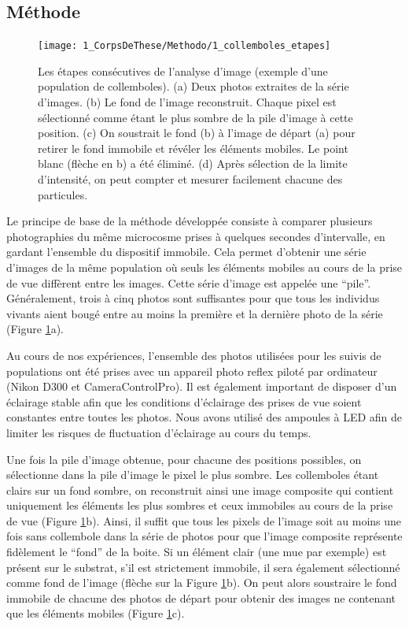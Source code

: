 \subsection{Méthode}

\begin{figure}[!ht]
\begin{center}
\texttt{[image: 1\_CorpsDeThese/Methodo/1\_collemboles\_etapes]}
\caption[ Les étapes
de l'analyse d'image]{Les étapes consécutives de l'analyse d'image (exemple
d'une population de collemboles).
(a) Deux photos extraites de la série d'images. (b) Le fond de l'image
reconstruit. Chaque pixel est sélectionné comme étant le plus sombre de la
pile d'image à cette position. (c) On soustrait le fond (b) à l'image de départ
(a) pour retirer le fond immobile et révéler les éléments mobiles. Le point blanc
(flèche en b) a été éliminé. (d) Après sélection de la limite d'intensité, on
peut compter et mesurer facilement chacune des particules.}
\label{fig:photoetapes}
\end{center}
\end{figure}



Le principe de base de la méthode développée consiste à comparer plusieurs
photographies du même microcosme prises à quelques secondes d'intervalle, en
gardant l'ensemble du dispositif immobile. Cela permet d'obtenir une série
d'images de la même population où seuls les éléments mobiles au cours de la
prise de vue diffèrent entre les images. Cette série d'image est appelée une
``pile''.
Généralement, trois à cinq photos sont suffisantes pour que tous les individus
vivants aient bougé entre au moins la première et la dernière photo de la
série (Figure \ref{fig:photoetapes}a).

Au cours de nos expériences, l'ensemble des photos utilisées pour les suivis
de populations ont été prises avec un appareil photo reflex piloté par
ordinateur (Nikon D300 et CameraControlPro\textcopyright). Il est également important de disposer d'un
éclairage stable afin que les conditions d'éclairage des prises de vue soient
constantes entre toutes les photos. Nous avons utilisé des ampoules à LED afin
de limiter les risques de fluctuation d'éclairage au cours du temps. 

Une fois la pile d'image obtenue, pour chacune des positions possibles, on
sélectionne dans la pile d'image le pixel le plus sombre. Les collemboles
étant clairs sur un fond sombre, on reconstruit ainsi une image composite qui
contient uniquement les éléments les plus sombres et ceux immobiles au cours de
la prise de vue (Figure \ref{fig:photoetapes}b).
Ainsi, il suffit que tous les pixels de l'image soit au moins une fois sans collembole
dans la série de photos pour que l'image composite représente fidèlement le
``fond'' de la boite. Si un élément clair (une mue par exemple) est présent sur
le substrat, s'il est strictement immobile, il sera également sélectionné comme
fond de l'image (flèche sur la Figure \ref{fig:photoetapes}b). 
On peut alors soustraire le fond immobile de chacune des photos de départ pour
obtenir des images ne contenant que les éléments mobiles (Figure
\ref{fig:photoetapes}c). 

